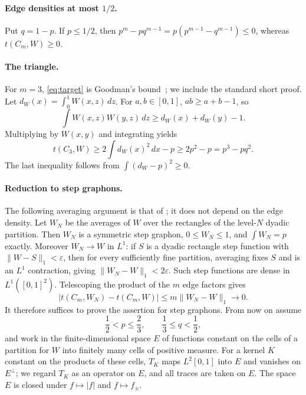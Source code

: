 \documentclass[11pt]{article}
\numberwithin{equation}{section}
\theoremstyle{remark}
\newcommand{\norm}[1]{\lVert #1\rVert}
\begin{document}
\paragraph{Edge densities at most $1/2$.}
Put $q=1-p$. If $p\le1/2$, then $p^{m}-pq^{m-1}=p(p^{m-1}-q^{m-1})\le0$, whereas $t(C_m,W)\ge0$.

\paragraph{The triangle.}
For $m=3$, \eqref{eq:target} is Goodman's bound~\cite{goodman1959sets}; we include the standard short proof. Let $d_W(x)=\int_0^1 W(x,z)\,dz$. For $a,b\in[0,1]$, $ab\ge a+b-1$, so
\[
 \int W(x,z)W(y,z)\,dz\ge d_W(x)+d_W(y)-1.
\]
Multiplying by $W(x,y)$ and integrating yields
\[
 t(C_3,W)\ge2\int d_W(x)^2\,dx-p\ge2p^2-p=p^3-pq^2.
\]
The last inequality follows from $\int(d_W-p)^2\ge0$.

\paragraph{Reduction to step graphons.}
The following averaging argument is that of \cite[Lemma~2.1 and Appendix~A]{kim2026goodman}; it does not depend on the edge density. Let $W_N$ be the averages of $W$ over the rectangles of the level-$N$ dyadic partition. Then $W_N$ is a symmetric step graphon, $0\le W_N\le1$, and $\int W_N=p$ exactly. Moreover $W_N\to W$ in $L^1$: if $S$ is a dyadic rectangle step function with $\norm{W-S}_1<\varepsilon$, then for every sufficiently fine partition, averaging fixes $S$ and is an $L^1$ contraction, giving $\norm{W_N-W}_1<2\varepsilon$. Such step functions are dense in $L^1([0,1]^2)$.
Telescoping the product of the $m$ edge factors gives
\begin{equation}\label{eq:continuity}
 |t(C_m,W_N)-t(C_m,W)|\le m\norm{W_N-W}_1\longrightarrow0.
\end{equation}
It therefore suffices to prove the assertion for step graphons. From now on assume
\begin{equation}\label{eq:range}
 \frac12<p\le\frac23,\qquad \frac13\le q<\frac12,
\end{equation}
and work in the finite-dimensional space $E$ of functions constant on the cells of a partition for $W$ into finitely many cells of positive measure. For a kernel $K$ constant on the products of these cells, $T_K$ maps $L^2[0,1]$ into $E$ and vanishes on $E^\perp$; we regard $T_K$ as an operator on $E$, and all traces are taken on $E$. The space $E$ is closed under $f\mapsto|f|$ and $f\mapsto f_\pm$.
\end{document}
